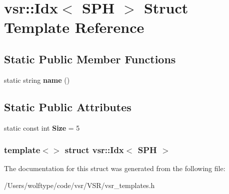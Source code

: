 \hypertarget{structvsr_1_1_idx_3_01_s_p_h_01_4}{\section{vsr\-:\-:Idx$<$ S\-P\-H $>$ Struct Template Reference}
\label{structvsr_1_1_idx_3_01_s_p_h_01_4}
}
\subsection*{Static Public Member Functions}
\begin{DoxyCompactItemize}
\item 
\hypertarget{structvsr_1_1_idx_3_01_s_p_h_01_4_ae6cd40d85c41d25e920fa73d7e435a32}{static string {\bfseries name} ()}\label{structvsr_1_1_idx_3_01_s_p_h_01_4_ae6cd40d85c41d25e920fa73d7e435a32}

\end{DoxyCompactItemize}
\subsection*{Static Public Attributes}
\begin{DoxyCompactItemize}
\item 
\hypertarget{structvsr_1_1_idx_3_01_s_p_h_01_4_a7bd29949545180e8eb21542cd8d39f70}{static const int {\bfseries Size} = 5}\label{structvsr_1_1_idx_3_01_s_p_h_01_4_a7bd29949545180e8eb21542cd8d39f70}

\end{DoxyCompactItemize}
\subsubsection*{template$<$$>$ struct vsr\-::\-Idx$<$ S\-P\-H $>$}



The documentation for this struct was generated from the following file\-:\begin{DoxyCompactItemize}
\item 
/\-Users/wolftype/code/vsr/\-V\-S\-R/vsr\-\_\-templates.\-h\end{DoxyCompactItemize}
